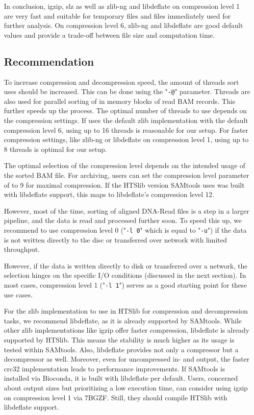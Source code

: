 In conclusion, igzip, slz as well as zlib-ng and libdeflate on compression level 1 are very fast and suitable for temporary files and files immediately used for further analysis. On compression level 6, zlib-ng and libdeflate are good default values and provide a trade-off between file size and computation time. 

\subsection{Recommendation}
To increase compression and decompression speed, the amount of threads \sort sort uses should be increased. This can be done using the "\texttt{-@}" parameter. Threads are also used for parallel sorting of in memory blocks of read BAM records. This further speeds up the process. The optimal number of threads to use depends on the compression settings. If \sort uses the default zlib implementation with the default compression level 6, using up to 16 threads is reasonable for our setup. For faster compression settings, like zlib-ng or libdeflate on compression level 1, using up to 8 threads is optimal for our setup.

The optimal selection of the compression level depends on the intended usage of the sorted BAM file.
For archiving, users can set the compression level parameter of \sort to 9 for maximal compression. If the HTSlib version SAMtools uses was built with libdeflate support, this maps to libdeflate's compression level 12. 

However, most of the time, sorting of aligned DNA-Read files is a step in a larger pipeline, and the data is read and processed further soon.
To speed this up, we recommend to use compression level 0 ("\texttt{-l 0}" which is equal to "\texttt{-u}") if the data is not written directly to the disc or transferred over network with limited throughput. 

However, if the data is written directly to disk or transferred over a network, the selection hinges on the specific I/O conditions (discussed in the next section). In most cases, compression level 1 ("\texttt{-l 1}") serves as a good starting point for these use cases.

For the zlib implementation to use in HTSlib for compression and decompression tasks, we recommend libdeflate, as it is already supported by SAMtools. While other zlib implementations like igzip offer faster compression, libdeflate is already supported by HTSlib. This means the stability is much higher as its usage is tested within SAMtools. Also, libdeflate provides not only a compressor but a decompressor as well. Moreover, even for uncompressed in- and output, the faster crc32 implementation leads to performance improvements. 
If SAMtools is installed via Bioconda, it is built with libdeflate per default. 
Users, concerned about output sizes but prioritizing a low execution time, can consider using igzip on compression level 1 via 7BGZF. Still, they should compile HTSlib with libdeflate support. 



